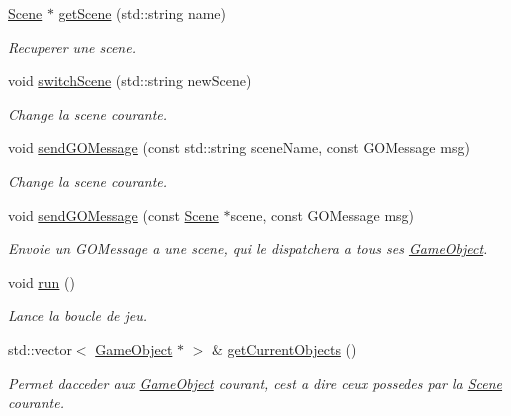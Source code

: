 \begin{DoxyCompactItemize}
\hyperlink{class_scene}{Scene} $\ast$ \hyperlink{class_game_engine_ac70d59f0de33c34f84863a550408a476}{get\+Scene} (std\+::string name)
\begin{DoxyCompactList}\small\item\em Recuperer une scene. \end{DoxyCompactList}\item 
void \hyperlink{class_game_engine_a000c4cc070830d727f349b094ab402e3}{switch\+Scene} (std\+::string new\+Scene)
\begin{DoxyCompactList}\small\item\em Change la scene courante. \end{DoxyCompactList}\item 
void \hyperlink{class_game_engine_adabcb595b67641a2b090a4245a42febd}{send\+G\+O\+Message} (const std\+::string scene\+Name, const G\+O\+Message msg)
\begin{DoxyCompactList}\small\item\em Change la scene courante. \end{DoxyCompactList}\item 
void \hyperlink{class_game_engine_af079adf40fe6dd3eb152257abc2e2ca6}{send\+G\+O\+Message} (const \hyperlink{class_scene}{Scene} $\ast$scene, const G\+O\+Message msg)
\begin{DoxyCompactList}\small\item\em Envoie un G\+O\+Message a une scene, qui le dispatchera a tous ses \hyperlink{class_game_object}{Game\+Object}. \end{DoxyCompactList}\item 
\hypertarget{class_game_engine_ab01970da2c68fefbf48b98c59d5627ae}{}\label{class_game_engine_ab01970da2c68fefbf48b98c59d5627ae} 
void \hyperlink{class_game_engine_ab01970da2c68fefbf48b98c59d5627ae}{run} ()
\begin{DoxyCompactList}\small\item\em Lance la boucle de jeu. \end{DoxyCompactList}\item 
std\+::vector$<$ \hyperlink{class_game_object}{Game\+Object} $\ast$ $>$ \& \hyperlink{class_game_engine_a3c121b430cbe2b77ba53ba4cfe295322}{get\+Current\+Objects} ()
\begin{DoxyCompactList}\small\item\em Permet d\textquotesingle{}acceder aux \hyperlink{class_game_object}{Game\+Object} courant, c\textquotesingle{}est a dire ceux possedes par la \hyperlink{class_scene}{Scene} courante. \end{DoxyCompactList}\item 

\end{DoxyCompactItemize}

